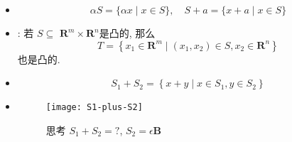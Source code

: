 \documentclass[handout]{beamer}
\begin{document}
\begin{frame}

\begin{itemize}%
  \item<only@1-2>
$$
\alpha S=\{\alpha x \mid x \in S\}, \quad S+a=\{x+a \mid x \in S\}
$$

\item<only@2-2>: 若 $S \subseteq$ $\mathbf{R}^{m} \times \mathbf{R}^{n}$是凸的, 那么
$$
T=\left\{x_{1} \in \mathbf{R}^{m} \mid\left(x_{1}, x_{2}\right) \in S, x_{2} \in \mathbf{R}^{n}\right\}
$$
也是凸的.

\item<only@3-5> 
$$
S_{1}+S_{2}=\left\{x+y \mid x \in S_{1}, y \in S_{2}\right\}
$$

\item<only@3-3>[]  
\begin{figure}[H]
\begin{center}
  \texttt{[image: S1-plus-S2]}
\end{center}
\caption{思考 $S_1+S_2= ?$,  $S_2 =\epsilon \mathbf{B}$}
\end{figure}





\end{itemize}
\end{frame}
\end{document}
